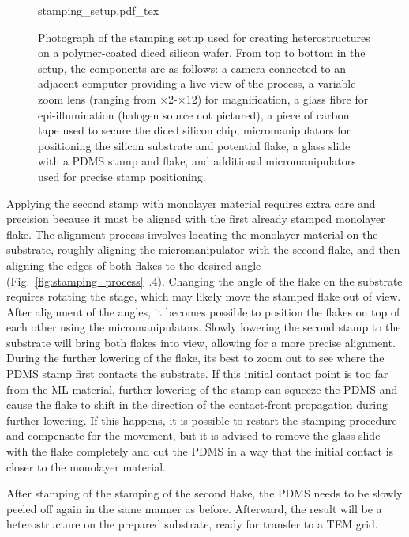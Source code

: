 \begin{figure}[hb]
	\centering
	\def\svgwidth{1\linewidth}
	{stamping_setup.pdf_tex}
    \caption{Photograph of the stamping setup used for creating heterostructures on a polymer-coated diced silicon wafer. 
    From top to bottom in the setup, the components are as follows: a camera connected to an adjacent computer providing a live view of the process, a variable zoom lens (ranging from $\times$2\--$\times$12) for magnification, a glass fibre for epi-illumination (halogen source not pictured), a piece of carbon tape used to secure the diced silicon chip, micromanipulators for positioning the silicon substrate and potential flake, a glass slide with a PDMS stamp and flake, and additional micromanipulators used for precise stamp positioning.}
	\label{fig:stamping_set-up}
\end{figure}

Applying the second stamp with monolayer material requires extra care and precision because  it must be aligned with the first already stamped monolayer flake. 
%
The alignment process involves locating the monolayer material on the substrate, roughly aligning the micromanipulator with the second flake, and then aligning the edges of both flakes to the desired angle (Fig.~\ref{fig:stamping_process}~.4).
%
Changing the angle of the flake on the substrate requires rotating the stage, which may likely move the stamped flake out of view. 
%
After alignment of the angles, it becomes possible to position the flakes on top of each other using the micromanipulators. 
%
Slowly lowering the second stamp to the substrate will bring both flakes into view, allowing for a more precise alignment.
%
During the further lowering of the flake, its best to zoom out to see where the PDMS stamp first contacts the substrate. 
%
If this initial contact point is too far from the ML material, further lowering of the stamp can squeeze the PDMS and cause the flake to shift in the direction of the contact-front propagation during further lowering.
%
If this happens, it is possible to restart the stamping procedure and compensate for the movement, but it is advised to remove the glass slide with the flake completely and cut the PDMS in a way that the initial contact is closer to the monolayer material.

After stamping of the stamping of the second flake, the PDMS needs to be slowly peeled off again in the same manner as before.
%
Afterward, the result will be a heterostructure on the prepared substrate, ready for transfer to a TEM grid.

